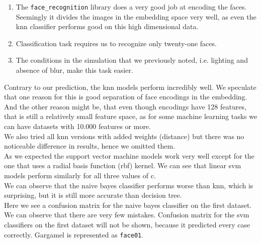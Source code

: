 \documentclass[12pt,a4paper]{article}
\begin{document}
    \begin{enumerate}
      \item The \texttt{face\_recognition} library does a very good job at encoding the faces. Seemingly it divides the images in the embedding space very well, as even the knn classifier performs good on this high dimensional data.
      \item Classification task requires us to recognize only twenty-one faces.
      \item The conditions in the simulation that we previously noted, i.e. lighting and absence of blur, make this task easier.
    \end{enumerate}

    Contrary to our prediction, the knn models perform incredibly well. We speculate that one reason for this is good separation of face encodings in the embedding. And the other reason might be, that even though encodings have 128 features, that is still a relatively small feature space, as for some machine learning tasks we can have datasets with 10.000 features or more. \\

    We also tried all knn versions with added weights (distance) but there was no noticeable difference in results, hence we omitted them. \\

    As we expected the support vector machine models work very well except for the one that uses a radial basis function (rbf) kernel. We can see that linear svm models perform similarly for all three values of c. \\

    We can observe that the naive bayes classifier performs worse than knn, which is surprising, but it is still more accurate than decision tree. \\

    Here we see a confusion matrix for the naive bayes classifier on the first dataset. We can observe that there are very few mistakes. Confusion matrix for the svm classifiers on the first dataset will not be shown, because it predicted every case correctly. Gargamel is represented as \texttt{face01}.
    
\end{document}
